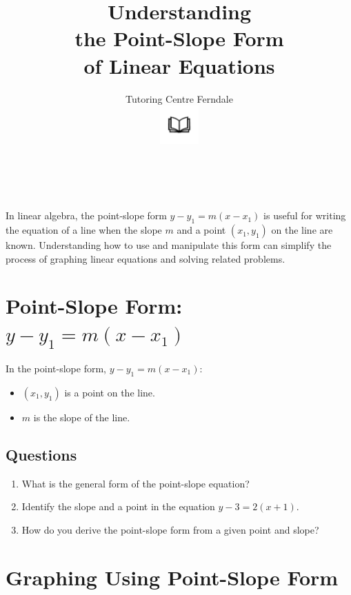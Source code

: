 \documentclass[12pt]{article}
\begin{document}
\title{Understanding\\the Point-Slope Form\\of Linear Equations}\\
\author{Tutoring Centre Ferndale\\
\includegraphics[width=4em]{ApS_logo.png}}
\date{}
\maketitle

In linear algebra, the point-slope form \(y - y_1 = m(x - x_1)\) is useful for writing the equation of a line when the slope \(m\) and a point \((x_1, y_1)\) on the line are known. Understanding how to use and manipulate this form can simplify the process of graphing linear equations and solving related problems.

\section*{Point-Slope Form: \(y - y_1 = m(x - x_1)\)}

In the point-slope form, \(y - y_1 = m(x - x_1)\):
\begin{itemize}
    \item \((x_1, y_1)\) is a point on the line.
    \item \(m\) is the slope of the line.
\end{itemize}

\subsection*{Questions}
\begin{enumerate}
    \item What is the general form of the point-slope equation?
    \item Identify the slope and a point in the equation \(y - 3 = 2(x + 1)\).
    \item How do you derive the point-slope form from a given point and slope?
\end{enumerate}

\newpage

\section*{Graphing Using Point-Slope Form}
\end{document}
